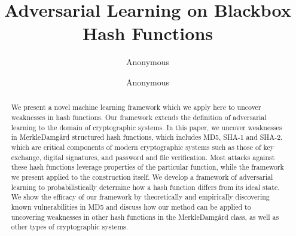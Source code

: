 \documentclass[letterpaper,twocolumn,10pt]{article}
\begin{document}

\date{}

\title{\Large \bf Adversarial Learning on Blackbox Hash Functions}

\author{
{\rm Anonymous}\\
\and
{\rm Anonymous}\\
} %

\maketitle

\begin{abstract}
We present a novel machine learning framework which we apply here to uncover weaknesses in hash functions. Our framework extends the definition of adversarial learning to the domain of cryptographic systems. In this paper, we uncover weaknesses in Merkle{\textendash}Damg\r{a}rd structured hash functions, which includes MD5, SHA-1 and SHA-2. which are critical components of modern cryptographic systems such as those of key exchange, digital signatures, and password and file verification. Most attacks against these hash functions leverage properties of the particular function, while the framework we present applied to the construction itself. We develop a framework of adversarial learning to probabilistically determine how a hash function differs from its ideal state. We show the efficacy of our framework by theoretically and empirically discovering known vulnerabilities in MD5 and discuss how our method can be applied to uncovering weaknesses in other hash functions in the Merkle{\textendash}Damg\r{a}rd class, as well as other types of cryptographic systems.
\end{abstract}

\end{document}
